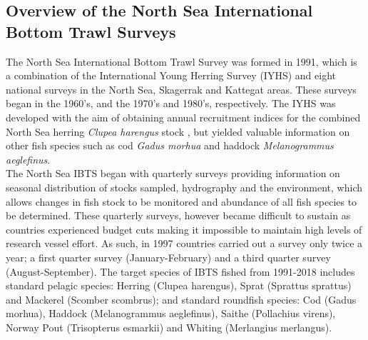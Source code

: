 \documentclass[a4paper 12pt]{article}
\numberwithin{equation}{section}
\begin{document}
\subsection{Overview of the North Sea International Bottom Trawl Surveys}
\label{overview}
\indent The North Sea International Bottom Trawl Survey was formed in 1991, which is a combination of the International Young Herring Survey (IYHS) and eight national surveys in the North Sea, Skagerrak and Kattegat areas. These surveys began in the 1960's, and the 1970's and 1980's, respectively. The IYHS was developed with the aim of obtaining annual recruitment indices for the combined North Sea herring \emph{Clupea harengus} stock \citep{ICES2012}, but yielded valuable information on other fish species such as cod \emph{Gadus morhua} and haddock \emph{Melanogrammus aeglefinus}.\\
\indent The North Sea IBTS began with quarterly surveys providing information on seasonal distribution of stocks sampled, hydrography and the environment, which allows changes in fish stock to be monitored and abundance of all fish species to be determined. These quarterly surveys, however became difficult to sustain as countries experienced budget cuts making it impossible to maintain high levels of research vessel effort. As such, in 1997 countries carried out a survey only twice a year; a first quarter survey (January-February) and a third quarter survey (August-September). The target species of IBTS fished from 1991-2018 includes standard pelagic species: Herring (Clupea harengus), Sprat (Sprattus sprattus) and Mackerel (Scomber scombrus); and standard roundfish species: Cod (Gadus morhua), Haddock (Melanogrammus aeglefinus), Saithe (Pollachius virens),  Norway Pout (Trisopterus esmarkii)  and Whiting (Merlangius merlangus).
\end{document}
